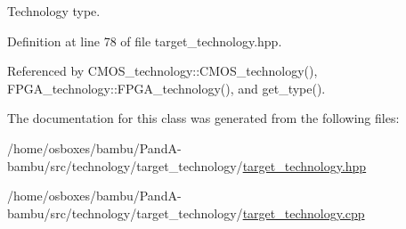 Technology type. 



Definition at line 78 of file target\+\_\+technology.\+hpp.



Referenced by C\+M\+O\+S\+\_\+technology\+::\+C\+M\+O\+S\+\_\+technology(), F\+P\+G\+A\+\_\+technology\+::\+F\+P\+G\+A\+\_\+technology(), and get\+\_\+type().



The documentation for this class was generated from the following files\+:\begin{DoxyCompactItemize}
\item 
/home/osboxes/bambu/\+Pand\+A-\/bambu/src/technology/target\+\_\+technology/\hyperlink{target__technology_8hpp}{target\+\_\+technology.\+hpp}\item 
/home/osboxes/bambu/\+Pand\+A-\/bambu/src/technology/target\+\_\+technology/\hyperlink{target__technology_8cpp}{target\+\_\+technology.\+cpp}\end{DoxyCompactItemize}

